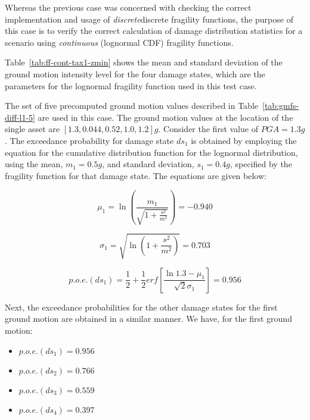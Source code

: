 Whereas the previous case was concerned with checking the correct implementation and usage of \emph{discrete}discrete fragility functions, the purpose of this case is to verify the correct calculation of damage distribution statistics for a scenario using \emph{continuous} (lognormal CDF) fragility functions.



Table~\ref{tab:ff-cont-tax1-zmin} shows the mean and standard deviation of the ground motion intensity level for the four damage states, which are the parameters for the lognormal fragility function used in this test case.

The set of five precomputed ground motion values described in Table~\ref{tab:gmfs-diff-l1-5}  are used in this case. The ground motion values at the location of the single asset are $[1.3, 0.044, 0.52, 1.0, 1.2] g$. Consider the first value of $PGA = 1.3 g$. The exceedance probability for damage state $ds_1$ is obtained by employing the equation for the cumulative distribution function for the lognormal distribution, using the mean, $m_1 = 0.5 g$, and standard deviation, $s_1 = 0.4 g$, specified by the fragility function for that damage state. The equations are given below:

\begin{equation}
	\mu_1 = \ln \left( \frac{m_1}{\sqrt{1 + \frac{s^2}{m^2}}} \right) = -0.940
\end{equation}

\begin{equation}
	\sigma_1 = \sqrt{\ln \left( 1 + \frac{s^2}{m^2} \right)} = 0.703
\end{equation}

\begin{equation}
	p.o.e.(ds_1) = \frac{1}{2} + \frac{1}{2} erf \left[ \frac{\ln 1.3 - \mu_1}{\sqrt{2} \sigma_1} \right] = 0.956
\end{equation}

Next, the exceedance probabilities for the other damage states for the first ground motion are obtained in a similar manner. We have, for the first ground motion:

\begin{itemize}
	\item $p.o.e.(ds_1) = 0.956$
	\item $p.o.e.(ds_2) = 0.766$
	\item $p.o.e.(ds_3) = 0.559$
	\item $p.o.e.(ds_4) = 0.397$
\end{itemize}

